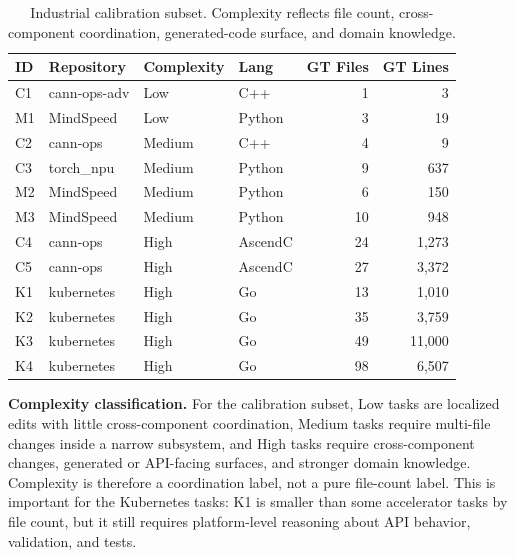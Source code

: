\begin{table}[t]
  \caption{Industrial calibration subset. Complexity reflects file count, cross-component coordination, generated-code surface, and domain knowledge.}
  \label{tab:tasks}
  \centering
  \small
  \begin{tabular*}{\textwidth}{@{\extracolsep{\fill}}llllrr@{}}
    \toprule
    \textbf{ID} & \textbf{Repository} & \textbf{Complexity} & \textbf{Lang} & \textbf{GT Files} & \textbf{GT Lines} \\
    \midrule
    C1 & cann-ops-adv  & Low    & C++          &   1 &       3 \\
    M1 & MindSpeed     & Low    & Python       &   3 &      19 \\
    \midrule
    C2 & cann-ops      & Medium & C++          &   4 &       9 \\
    C3 & torch\_npu    & Medium & Python       &   9 &     637 \\
    M2 & MindSpeed     & Medium & Python       &   6 &     150 \\
    M3 & MindSpeed     & Medium & Python       &  10 &     948 \\
    \midrule
    C4 & cann-ops      & High   & AscendC      &  24 &   1{,}273 \\
    C5 & cann-ops      & High   & AscendC      &  27 &   3{,}372 \\
    K1 & kubernetes    & High   & Go           &  13 &   1{,}010 \\
    K2 & kubernetes    & High   & Go           &  35 &   3{,}759 \\
    K3 & kubernetes    & High   & Go           &  49 &  11{,}000 \\
    K4 & kubernetes    & High   & Go           &  98 &   6{,}507 \\
    \bottomrule
  \end{tabular*}
\end{table}

\textbf{Complexity classification.}
For the calibration subset, Low tasks are localized edits with little cross-component coordination, Medium tasks require multi-file changes inside a narrow subsystem, and High tasks require cross-component changes, generated or API-facing surfaces, and stronger domain knowledge. Complexity is therefore a coordination label, not a pure file-count label. This is important for the Kubernetes tasks: K1 is smaller than some accelerator tasks by file count, but it still requires platform-level reasoning about API behavior, validation, and tests.


